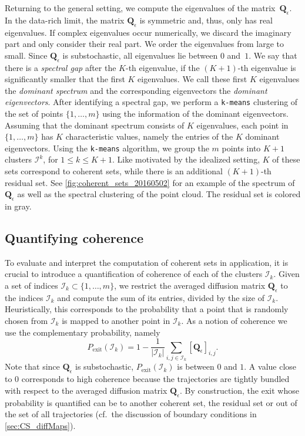 Returning to the general setting, we compute the eigenvalues of the matrix~$\mathbf{Q}_\epsilon$. In the data-rich limit, the matrix $\mathbf{Q}_\epsilon$ is symmetric and, thus, only has real eigenvalues. If complex eigenvalues occur numerically, we discard the imaginary part and only consider their real part. We order the eigenvalues from large to small. Since $\mathbf{Q}_\epsilon$ is substochastic, all eigenvalues lie between $0$ and~$1$. We say that there is a \emph{spectral gap} after the $K$-th eigenvalue, if the $(K+1)$-th eigenvalue is significantly smaller that the first $K$ eigenvalues. We call these first $K$ eigenvalues the \emph{dominant spectrum} and the corresponding eigenvectors the \emph{dominant eigenvectors}. After identifying a spectral gap, we perform a \texttt{k-means} clustering of the set of points $\{1, \hdots, m\}$ using the information of the dominant eigenvectors. Assuming that the dominant spectrum consists of $K$ eigenvalues, each point in $\{1, \hdots, m\}$ has $K$ characteristic values, namely the entries of the $K$ dominant eigenvectors. Using the \texttt{k-means} algorithm, we group the $m$ points into $K+1$ clusters $\mathcal{I}^k$, for $1 \leq k \leq K+1$. Like motivated by the idealized setting, $K$ of these sets correspond to coherent sets, while there is an additional $(K+1)$-th residual set. See \cref{fig:coherent_sets_20160502} for an example of the spectrum of $\mathbf{Q}_\epsilon$ as well as the spectral clustering of the point cloud. The residual set is colored in gray.

\subsection{Quantifying coherence}\label{sec:CS_quantification}
To evaluate and interpret the computation of coherent sets in application, it is crucial to introduce a quantification of coherence of each of the clusters $\mathcal{I}_k$. Given a set of indices $\mathcal{I}_k \subset \{1, \hdots, m\}$, we restrict the averaged diffusion matrix $\mathbf{Q}_\epsilon$ to the indices $\mathcal{I}_k$ and compute the sum of its entries, divided by the size of $\mathcal{I}_k$. Heuristically, this corresponds to the probability that a point that is randomly chosen from $\mathcal{I}_k$ is mapped to another point in $\mathcal{I}_k$. As a notion of coherence we use the complementary probability, namely
\begin{equation} \label{eq:exitP}
    P_\text{exit}(\mathcal{I}_k) = 1 - \frac{1}{|\mathcal{I}_k|} \sum_{i,j\in \mathcal{I}_k} \left[\mathbf{Q}_\epsilon\right]_{i,j}.
\end{equation}
Note that since $\mathbf{Q}_\epsilon$ is substochastic, $ P_\text{exit}(\mathcal{I}_k)$ is between $0$ and $1$. A value close to $0$ corresponds to high coherence because the trajectories are tightly bundled with respect to the averaged diffusion matrix $\mathbf{Q}_\epsilon$. By construction, the exit whose probability is quantified can be to another coherent set, the residual set or out of the set of all trajectories (cf.~the discussion of boundary conditions in \cref{sec:CS_diffMaps}).

